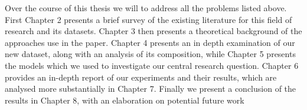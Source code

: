 Over the course of this thesis we will to address all the problems listed above.
First Chapter 2 presents a brief survey of the existing literature for this field of research and its datasets.
Chapter 3 then presents a theoretical background of the approaches use in the paper. 
Chapter 4 presents an in depth examination of our new dataset, along with an analysis of its composition, while Chapter 5 presents the models which we used to investigate our central research question. 
Chapter 6 provides an in-depth report of our experiments and their results, which are analysed more substantially in Chapter 7. 
Finally we present a conclusion of the results in Chapter 8, with an elaboration on potential future work









